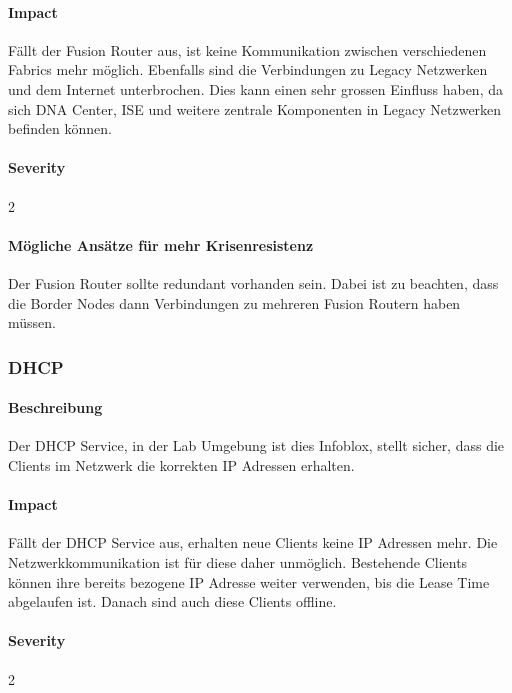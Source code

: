 \paragraph{Impact}

Fällt der Fusion Router aus, ist keine Kommunikation zwischen verschiedenen Fabrics mehr möglich. Ebenfalls sind die Verbindungen zu Legacy Netzwerken und dem Internet unterbrochen. Dies kann einen sehr grossen Einfluss haben, da sich DNA Center, ISE und weitere zentrale Komponenten in Legacy Netzwerken befinden können.

\paragraph{Severity} 2

\paragraph{Mögliche Ansätze für mehr Krisenresistenz}

Der Fusion Router sollte redundant vorhanden sein. Dabei ist zu beachten, dass die Border Nodes dann Verbindungen zu mehreren Fusion Routern haben müssen.

\subsubsection{DHCP}

\paragraph{Beschreibung}

Der DHCP Service, in der Lab Umgebung ist dies Infoblox, stellt sicher, dass die Clients im Netzwerk die korrekten IP Adressen erhalten.

\paragraph{Impact}

Fällt der DHCP Service aus, erhalten neue Clients keine IP Adressen mehr. Die Netzwerkkommunikation ist für diese daher unmöglich. Bestehende Clients können ihre bereits bezogene IP Adresse weiter verwenden, bis die Lease Time abgelaufen ist. Danach sind auch diese Clients offline.

\paragraph{Severity} 2

